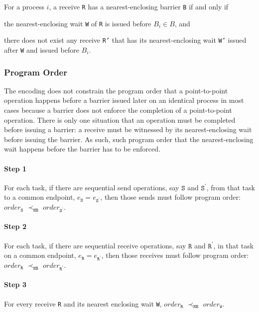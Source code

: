 \begin{definition}\label{def:nb}
For a process $i$, a receive \texttt{R} has a nearest-enclosing barrier \texttt{B} if and only if
\begin{compactenum}
\item the nearest-enclosing wait \texttt{W} of \texttt{R} is issued before $B_i\in B$, and
\item there does not exist any receive \texttt{R'} that has its nearest-enclosing wait \texttt{W'} issued after \texttt{W} and issued before $B_i$.
\end{compactenum}
\end{definition}

\subsubsection{Program Order}
The encoding does not constrain the program order that a point-to-point operation happens before a barrier issued later on an identical process in most cases because a barrier does not enforce the completion of a point-to-point operation. There is only one situation that an operation must be completed before issuing a barrier: a receive must be witnessed by its nearest-enclosing wait before issuing the barrier. As such, such program order that the nearest-enclosing wait happens before the barrier has to be enforced.

\paragraph*{Step 1} For each task, if there are sequential send
operations, say $\mathtt{S}$ and $\mathtt{S^\prime}$, from that task
to a common endpoint, $e_\mathtt{S} = e_\mathtt{S^\prime}$, then those
sends must follow program order: $\mathit{order}_\mathtt{S}$
$\prec_\mathtt{HB}$ $\mathit{order}_\mathtt{S^\prime}$.

\paragraph*{Step 2} For each task, if there are sequential receive
operations, say $\mathtt{R}$ and $\mathtt{R^\prime}$, in that task
on a common endpoint, $e_\mathtt{R} = e_\mathtt{R^\prime}$, then those
receives must follow program order: $\mathit{order}_\mathtt{R}$
$\prec_\mathtt{HB}$ $\mathit{order}_\mathtt{R^\prime}$.

\paragraph*{Step 3} For every receive \texttt{R} and its nearest
enclosing wait \texttt{W}, $\mathit{order}_\mathtt{R}$
$\prec_\mathtt{HB}$ $\mathit{order}_\mathtt{W}$.

